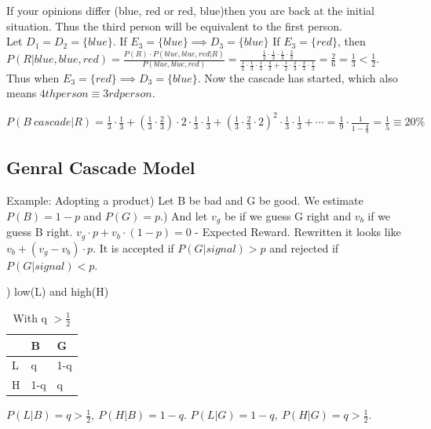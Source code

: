 \documentclass[12pt]{scrartcl}
\begin{document}
If your opinions differ (blue, red or red, blue)then you are back at the initial situation. Thus the third person will be equivalent to the first person.\\


\noindent Let $D_{1} = D_{2} = \{blue\}$. If $E_{3} = \{blue\} \implies D_{3} = \{blue\}$ 
If $E_{3} = \{red\}$, then $P(R|blue,blue,red) = \frac{P(R)\cdot P(blue,blue,red | R)}{P(blue,blue,red)} = \frac{\frac{1}{2}\cdot \frac{1}{3}\cdot \frac{1}{3}\cdot \frac{2}{3}}{\frac{1}{2}\cdot \frac{1}{3}\cdot \frac{1}{3}\cdot \frac{2}{3} + \cdot \frac{1}{2}\cdot \frac{2}{3}\cdot \frac{2}{3}\cdot \frac{1}{3}} = \frac{2}{6} = \frac{1}{3} < \frac{1}{2}$.
Thus when $E_{3} = \{red\} \implies D_{3} = \{blue\}$.
Now the cascade has started, which also means $4th person \equiv 3rd person$.



\noindent$P(B\ cascade| R) = \frac{1}{3}\cdot \frac{1}{3} + (\frac{1}{3}\cdot \frac{2}{3})\cdot 2\cdot \frac{1}{3}\cdot \frac{1}{3} + 
(\frac{1}{3}\cdot \frac{2}{3}\cdot 2)^{2}\cdot \frac{1}{3}\cdot \frac{1}{3} + \cdots
= \frac{1}{9}\cdot \frac{1}{1 - \frac{4}{9}} = \frac{1}{5} \equiv 20\%$
\subsection{Genral Cascade Model}
Example: Adopting a product) Let B be bad and G be good. We estimate $P(B) = 1-p$ and $P(G) = p$.) And let $v_{g}$ be if we guess G right and $v_{b}$ if we guess B right.\newline
$v_{g}\cdot p + v_{b}\cdot (1-p) = 0$ - Expected Reward. Rewritten it looks like $v_{b} + (v_{g} - v_{b})\cdot p$.\newline
It is accepted if $P(G|signal) > p$ and rejected if $P(G | signal) < p$.

) low(L) and high(H)
\begin{table}[h]
\centering
\begin{tabular}{|l|l|l|}
\hline
  & B   & G   \\\hline
L & q   & 1-q \\\hline
H & 1-q & q  \\\hline
\end{tabular}
\caption{With q $> \frac{1}{2}$}
\label{my-label}
\end{table}

\noindent $P(L|B) = q > \frac{1}{2},\ P(H|B) = 1-q$. $P(L|G) = 1-q,\ P(H|G) = q > \frac{1}{2}$.\newline
\end{document}
